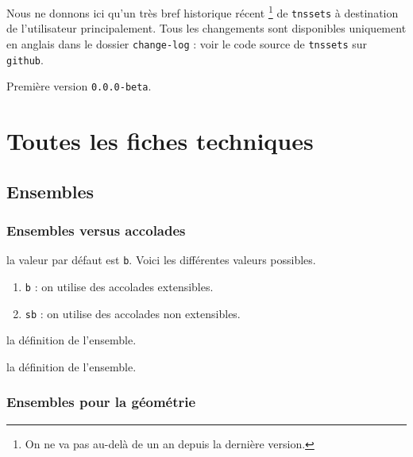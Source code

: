 \documentclass[12pt,a4paper]{article}
\theoremstyle{definition}
\begin{document}
Nous ne donnons ici qu'un très bref historique récent
\footnote{
	On ne va pas au-delà de un an depuis la dernière version.
}
de \verb+tnssets+ à destination de l'utilisateur principalement.
Tous les changements sont disponibles uniquement en anglais dans le dossier \verb+change-log+ : voir le code source de \verb+tnssets+ sur \verb+github+.

\begin{description}

    \medskip
    \item[2020-07-10] Première version \verb+0.0.0-beta+.

\end{description}


\newpage
\section{Toutes les fiches techniques} \label{techincal-ids}






\subsection{Ensembles}

\subsubsection{Ensembles versus accolades}




\IDoption{} la valeur par défaut est \verb+b+.  Voici les différentes valeurs possibles.
\begin{enumerate}
	\item \verb+b+ : on utilise des accolades extensibles.

	\item \verb+sb+ : on utilise des accolades non extensibles.
\end{enumerate}

\IDarg{} la définition de l'ensemble.

\IDarg{} la définition de l'ensemble.




\subsubsection{Ensembles pour la géométrie} \label{set-geo}
\end{document}
